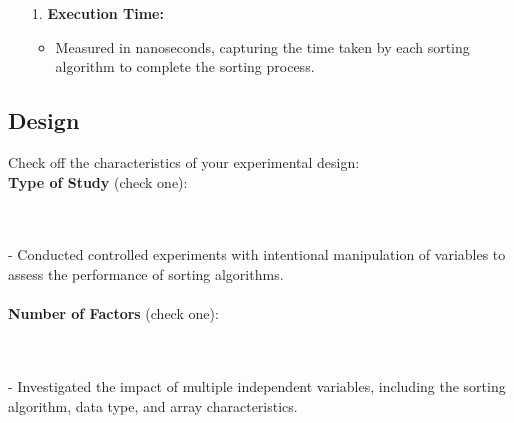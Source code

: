 \documentclass{article}
\begin{document}
\begin{tcolorbox}[title=Dependent Variable:, colback=white, colframe=black, arc=0pt, outer arc=0pt]
    \begin{itemize}
        \item[1.] \textbf{Execution Time:}
        \begin{itemize}
            \item Measured in nanoseconds, capturing the time taken by each sorting algorithm to complete the sorting process.
        \end{itemize}
    \end{itemize}
\end{tcolorbox}

\subsection{Design}
Check off the characteristics of your experimental design:\\

\textbf{Type of Study} (check one):\\
\noindent
\begin{minipage}{0.4\textwidth}
\end{minipage}%
\begin{minipage}{0.4\textwidth}
\end{minipage}%
\begin{minipage}{0.2\textwidth}
\end{minipage}\\\\
- Conducted controlled experiments with intentional manipulation of variables to assess the performance of sorting algorithms.
\\\\
\textbf{Number of Factors} (check one):\\
\noindent
\begin{minipage}{0.4\textwidth}
\end{minipage}%
\begin{minipage}{0.4\textwidth}
\end{minipage}%
\begin{minipage}{0.0\textwidth}
\end{minipage}\\\\
- Investigated the impact of multiple independent variables, including the sorting algorithm, data type, and array characteristics.
\end{document}
